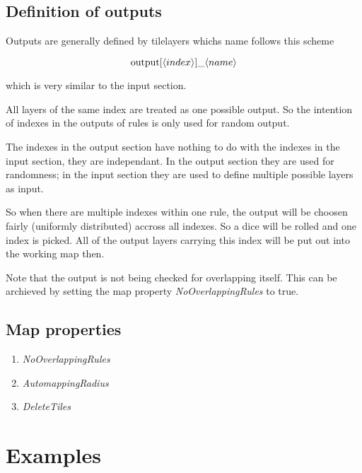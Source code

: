 \documentclass[dvips, a4paper, 12pt,listof=totoc, oneside, parskip]{scrbook}
\begin{document}
\section{Definition of outputs}

Outputs are generally defined by tilelayers whichs name follows this scheme

$$\textup{output}[\langle index \rangle]  \_ \langle name \rangle$$

which is very similar to the input section.

All layers of the same index are treated as one possible output.
So the intention of indexes in the outputs of rules is only used for random
output.

The indexes in the output section have nothing to do with the indexes in the input section,
they are independant. In the output section they are used for randomness; in the input section
they are used to define multiple possible layers as input.

So when there are multiple indexes within one rule, the output will be choosen
fairly (uniformly distributed) accross all indexes. So a dice will be rolled and one index is picked.
All of the output layers carrying this index will be put out into the working map then.

Note that the output is not being checked for overlapping itself. This can be archieved by
setting the map property \emph{NoOverlappingRules} to true. 

\section{Map properties}

\begin{enumerate}
  \item \emph{NoOverlappingRules}
  \item \emph{AutomappingRadius}
  \item \emph{DeleteTiles}
\end{enumerate}

\chapter{Examples}


\end{document}
